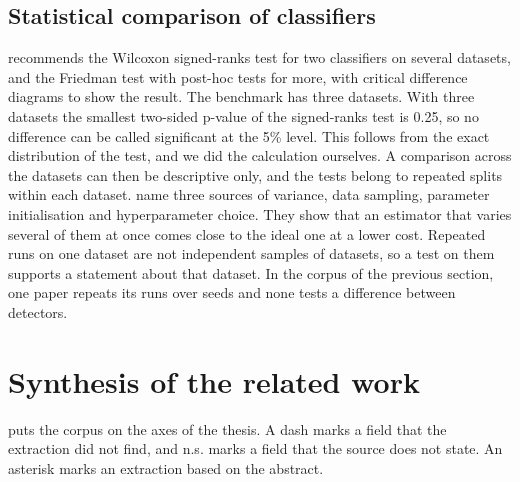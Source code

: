 \subsection{Statistical comparison of classifiers}
\label{sec:statistical-comparison}

\citet{demsar2006statistical} recommends the Wilcoxon signed-ranks test for two
classifiers on several datasets, and the Friedman test with post-hoc tests for
more, with critical difference diagrams to show the result. The benchmark has
three datasets. With three datasets the smallest two-sided p-value of the
signed-ranks test is 0.25, so no difference can be called significant at the
5\% level. This follows from the exact distribution of the test, and we did the
calculation ourselves. A comparison across the datasets can then be descriptive
only, and the tests belong to repeated splits within each dataset.
\citet{bouthillier2021variance} name three sources of variance, data sampling,
parameter initialisation and hyperparameter choice. They show that an estimator
that varies several of them at once comes close to the ideal one at a lower
cost. Repeated runs on one dataset are not independent samples of datasets, so
a test on them supports a statement about that dataset. In the corpus of the
previous section, one paper repeats its runs over seeds and none tests a
difference between detectors.

\section{Synthesis of the related work}
\label{sec:synthesis}

 puts the corpus on the axes of the thesis. A dash marks a
field that the extraction did not find, and n.s. marks a field that the source
does not state. An asterisk marks an extraction based on the abstract.

